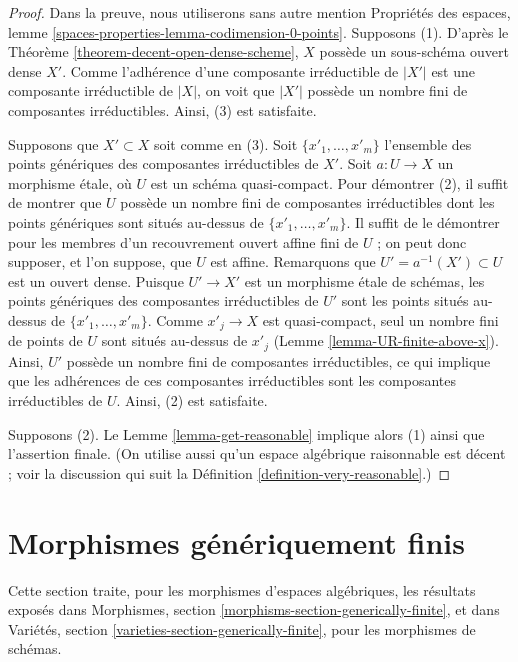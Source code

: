 \begin{proof}
Dans la preuve, nous utiliserons sans autre mention Propriétés des espaces,
lemme \ref{spaces-properties-lemma-codimension-0-points}.
Supposons (1). D'après le
Théorème \ref{theorem-decent-open-dense-scheme},
$X$ possède un sous-schéma ouvert dense $X'$.
Comme l'adhérence d'une composante irréductible de $|X'|$ est une composante
irréductible de $|X|$, on voit que $|X'|$ possède un nombre fini de
composantes irréductibles. Ainsi, (3) est satisfaite.

\medskip\noindent
Supposons que $X' \subset X$ soit comme en (3). Soit
$\{x'_1, \ldots, x'_m\}$ l'ensemble des points génériques des composantes
irréductibles de $X'$. Soit $a : U \to X$ un morphisme étale, où $U$ est un
schéma quasi-compact. Pour démontrer (2), il suffit de montrer que $U$ possède
un nombre fini de composantes irréductibles dont les points génériques sont
situés au-dessus de $\{x'_1, \ldots, x'_m\}$. Il suffit de le démontrer pour
les membres d'un recouvrement ouvert affine fini de $U$ ; on peut donc
supposer, et l'on suppose, que $U$ est affine.
Remarquons que $U' = a^{-1}(X') \subset U$ est un ouvert dense.
Puisque $U' \to X'$ est un morphisme étale de schémas, les points génériques
des composantes irréductibles de $U'$ sont les points situés au-dessus de
$\{x'_1, \ldots, x'_m\}$. Comme $x'_j \to X$ est quasi-compact, seul un nombre
fini de points de $U$ sont situés au-dessus de $x'_j$
(Lemme \ref{lemma-UR-finite-above-x}). Ainsi, $U'$ possède un nombre fini de
composantes irréductibles, ce qui implique que les adhérences de ces
composantes irréductibles sont les composantes irréductibles de $U$.
Ainsi, (2) est satisfaite.

\medskip\noindent
Supposons (2). Le Lemme \ref{lemma-get-reasonable} implique alors (1) ainsi
que l'assertion finale. (On utilise aussi qu'un espace algébrique raisonnable
est décent ; voir la discussion qui suit la
Définition \ref{definition-very-reasonable}.)
\end{proof}



\section{Morphismes génériquement finis}
\label{section-generically-finite}

\noindent
Cette section traite, pour les morphismes d'espaces algébriques, les résultats
exposés dans Morphismes, section
\ref{morphisms-section-generically-finite}, et dans
Variétés, section \ref{varieties-section-generically-finite},
pour les morphismes de schémas.

